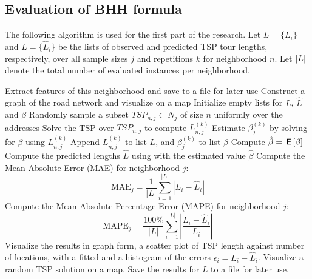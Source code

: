 \subsection{Evaluation of BHH formula}
The following algorithm is used for the first part of the research.
Let \( L = \{L_i\} \) and \( \hat{L} = \{\hat{L}_i\} \) be the lists of observed and predicted TSP tour lengths,
respectively, over all sample sizes \( j \) and repetitions \( k \) for neighborhood \( n \).
Let \( \left\vert L\right\vert \) denote the total number of evaluated instances per neighborhood.
\begin{algorithm}[H]
	\caption{Procedure for evaluating the predictive accuracy of Equation~\ref{eq:beardwood}}
	\label{alg:evaluation}
	\begin{algorithmic}[1]
		\State Extract features of this neighborhood and save to a file for later use
		\State Construct a graph of the road network and visualize on a map
		\State Initialize empty lists for \( L \), \( \hat{L} \) and $\beta$
		\State Randomly sample a subset \( TSP_{n,j} \subset N_j \) of size \( n \) uniformly over the addresses
		\State Solve the TSP over \( TSP_{n,j} \) to compute \( L_{n,j}^{(k)} \)
		\State Estimate $\beta_j^{(k)}$ by solving  for $\beta$ using \(L_{n,j}^{(k)}\)
		\State Append \( L_{n,j}^{(k)} \) to list \( L \), and $\beta_j^{(k)}$ to list $\beta$
		\EndFor
		\EndFor
		\State Compute $\hat\beta=\,\mathsf{E}\left[\beta\right]$
		\State Compute the predicted lengths \( \hat{L} \) using  with the estimated value $\hat\beta$
		\State Compute the Mean Absolute Error (MAE) for neighborhood \( j \):
		\[
			\text{MAE}_j = \frac{1}{|L|} \sum_{i=1}^{|L|} \left| L_i - \hat{L}_i \right|
		\]
		\State Compute the Mean Absolute Percentage Error (MAPE) for neighborhood \( j \):
		\[
			\text{MAPE}_j = \frac{100\%}{|L|} \sum_{i=1}^{|L|} \left| \frac{L_i - \hat{L}_i}{L_i} \right|
		\]
		\State Visualize the results in graph form, a scatter plot of TSP length against number of locations, with a fitted  and a histogram of the errors $\epsilon_i=L_i-\hat{L}_i$.
		\State Visualize a random TSP solution on a map.
		\State Save the results for $L$ to a file for later use.
		\EndFor
	\end{algorithmic}
\end{algorithm}
